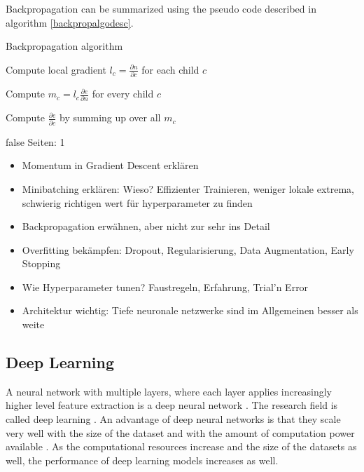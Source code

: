 \documentclass[draft,final,oneside]{vutinfth} %
\begin{document}
Backpropagation can be summarized using the pseudo code described in algorithm \ref{backpropalgodesc}.

\begin{algorithm}
\caption{Backpropagation algorithm \cite{dlvc}}
\label{backpropalgodesc}

 {

Compute local gradient $l_c = \frac{\partial n}{\partial c}$ for each child $c$

Compute $m_c = l_c  \frac{\partial e}{\partial n}$ for every child $c$

Compute $\frac{\partial e}{\partial c}$ by summing up over all $m_c$

}
\end{algorithm}

\if false
Seiten: 1
\begin{itemize}

\item Momentum in Gradient Descent erklären
\item Minibatching erklären: Wieso? Effizienter Trainieren, weniger lokale extrema, schwierig richtigen wert für hyperparameter zu finden
\item Backpropagation erwähnen, aber nicht zur sehr ins Detail
\item Overfitting bekämpfen: Dropout, Regularisierung, Data Augmentation, Early Stopping
\item Wie Hyperparameter tunen? Faustregeln, Erfahrung, Trial'n Error
\item Architektur wichtig: Tiefe neuronale netzwerke sind im Allgemeinen besser als weite

\end{itemize}
\fi

\subsection{Deep Learning} \label{dlbackground}

A neural network with multiple layers, where each layer applies increasingly higher level feature extraction is a deep neural network \cite{deeplearninginneuralnetworks}. The research field is called deep learning \cite{deeplearninginneuralnetworks}. An advantage of deep neural networks is that they scale very well with the size of the dataset and with the amount of computation power available \cite{alexnet}. As the computational resources increase and the size of the datasets as well, the performance of deep learning models increases as well.
\end{document}
